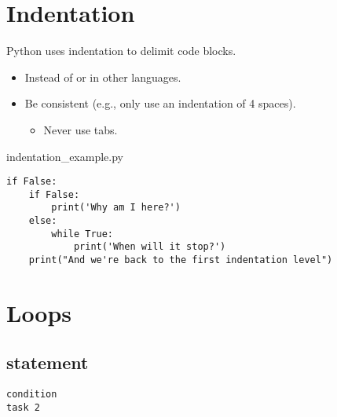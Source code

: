 \documentclass[aspectratio=1610,t]{beamer}
\begin{document}
\section{Indentation}
\makeTableOfContentsSection

\begin{pframe}
 Python uses indentation to delimit code blocks.
 \begin{itemize}
   \item Instead of  or  in other languages.
   \item Be consistent (e.g., only use an indentation of 4 spaces).
   \begin{itemize}
     \item Never use tabs.
   \end{itemize}
 \end{itemize}
 \begin{pythonfile}{indentation\_example.py}
  \begin{verbatim}
if False:
    if False:
        print('Why am I here?')
    else:
        while True:
            print('When will it stop?')
    print("And we're back to the first indentation level")
  \end{verbatim}
 \end{pythonfile}
\end{pframe}


\section{Loops}
\makeTableOfContentsSection

\begin{pframe}
 \begin{center}
  
 \end{center}
\end{pframe}


\subsection{ statement}
\begin{pframe}
 \begin{minipage}{0.47\textwidth}
 \begin{center}
  
 \end{center}
 \end{minipage}%
 \begin{minipage}{0.47\textwidth}
  \begin{pythondeclaration}
   \textvisiblespace\lstinline{condition}\emp{:}\\
   \textvisiblespace\textvisiblespace\textvisiblespace\textvisiblespace
   \lstinline{task 2}
  \end{pythondeclaration}
 \end{minipage}
\end{pframe}
\end{document}
